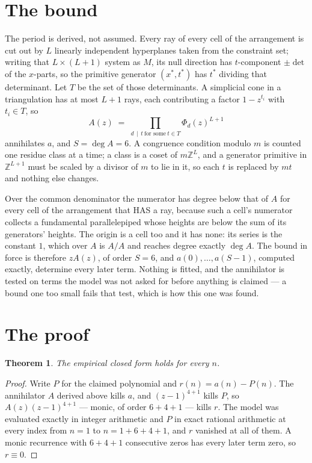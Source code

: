 \documentclass[11pt,a4paper]{article}
\theoremstyle{plain}
\newtheorem{theorem}{Theorem}
\theoremstyle{definition}
\begin{document}
\section{The bound}

The period is derived, not assumed. Every ray of every cell of the arrangement is cut out by
$L$ linearly independent hyperplanes taken from the constraint set; writing that $L\times(L+1)$
system as $M$, its null direction has $t$-component $\pm\det$ of the $x$-parts, so the
primitive generator $(x^*,t^*)$ has $t^*$ dividing that determinant. Let $T$ be the set of
those determinants. A simplicial cone in a triangulation has at most $L+1$ rays, each
contributing a factor $1-z^{t_i}$ with $t_i\in T$, so
\[
A(z)\;=\;\prod_{d\,\mid\,t\ \text{for some}\ t\in T}\Phi_d(z)^{L+1}
\]
annihilates $a$, and $S=\deg A=6$. A congruence condition modulo $m$ is counted one residue
class at a time; a class is a coset of $m\mathbb{Z}^L$, and a generator primitive in
$\mathbb{Z}^{L+1}$ must be scaled by a divisor of $m$ to lie in it, so each $t$ is replaced
by $mt$ and nothing else changes.

Over the common denominator the numerator has degree below that of $A$ for every cell of the
arrangement that HAS a ray, because such a cell's numerator collects a fundamental
parallelepiped whose heights are below the sum of its generators' heights. The origin is a cell
too and it has none: its series is the constant $1$, which over $A$ is $A/A$ and reaches degree
exactly $\deg A$. The bound in force is therefore $zA(z)$, of order $S=6$, and
$a(0),\dots,a(S-1)$, computed exactly, determine every later term. Nothing is fitted, and the
annihilator is tested on terms the model was not asked for before anything is claimed --- a
bound one too small fails that test, which is how this one was found.

\section{The proof}

\begin{theorem}
The empirical closed form holds for every $n$.
\end{theorem}

\begin{proof}
Write $P$ for the claimed polynomial and $r(n)=a(n)-P(n)$. The annihilator $A$ derived above
kills $a$, and $(z-1)^{4+1}$ kills $P$, so $A(z)(z-1)^{4+1}$ --- monic, of order
$6+4+1$ --- kills $r$. The model was evaluated exactly in integer arithmetic and $P$ in
exact rational arithmetic at every index from $n=1$ to $n=1+6+4+1$, and $r$ vanished
at all of them. A monic recurrence with $6+4+1$ consecutive zeros has every later term zero,
so $r\equiv0$.
\end{proof}
\end{document}
